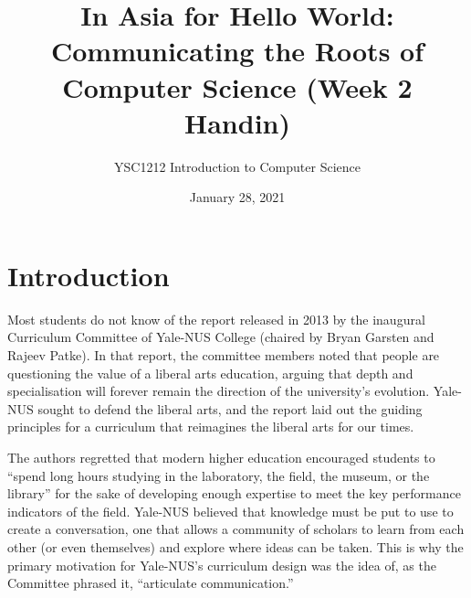 \documentclass{article}
\title{In Asia for Hello World: \linebreak Communicating the Roots of Computer Science \linebreak (Week 2 Handin) }
\author{YSC1212 Introduction to Computer Science}
\date{January 28, 2021}
\begin{document}
\maketitle

\newpage

\tableofcontents
\newpage
\raggedright

\section{Introduction}
Most students do not know of the report released in 2013 by the inaugural Curriculum Committee of Yale-NUS College (chaired by Bryan Garsten and Rajeev Patke). In that report, the committee members noted that people are questioning the value of a liberal arts education, arguing that depth and specialisation will forever remain the direction of the university’s evolution. Yale-NUS sought to defend the liberal arts, and the report laid out the guiding principles for a curriculum that reimagines the liberal arts for our times.
\linebreak

The authors regretted that modern higher education encouraged students to “spend long hours studying in the laboratory, the field, the museum, or the library”\citep{YNC} for the sake of developing enough expertise to meet the key performance indicators of the field. Yale-NUS believed that knowledge must be put to use to create a conversation, one that allows a community of scholars to learn from each other (or even themselves) and explore where ideas can be taken. This is why the primary motivation for Yale-NUS’s curriculum design was the idea of, as the Committee phrased it, “articulate communication.”\citep{YNC}
\linebreak
\end{document}

